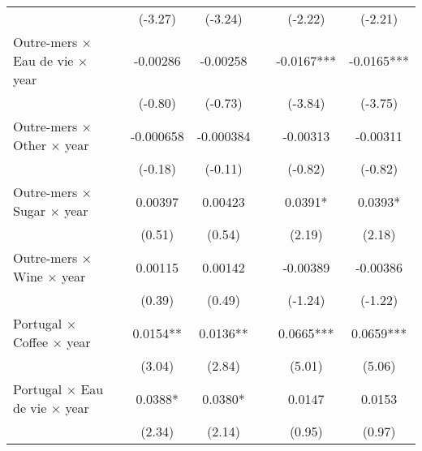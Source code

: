 {\begin{tabular}{l*{6}{c}}
                    &                     &     (-3.27)         &     (-3.24)         &                     &     (-2.22)         &     (-2.21)         \\
[1em]
Outre-mers $\times$ Eau de vie $\times$ year&                     &    -0.00286         &    -0.00258         &                     &     -0.0167***&     -0.0165***\\
                    &                     &     (-0.80)         &     (-0.73)         &                     &     (-3.84)         &     (-3.75)         \\
[1em]
Outre-mers $\times$ Other $\times$ year&                     &   -0.000658         &   -0.000384         &                     &    -0.00313         &    -0.00311         \\
                    &                     &     (-0.18)         &     (-0.11)         &                     &     (-0.82)         &     (-0.82)         \\
[1em]
Outre-mers $\times$ Sugar $\times$ year&                     &     0.00397         &     0.00423         &                     &      0.0391*  &      0.0393*  \\
                    &                     &      (0.51)         &      (0.54)         &                     &      (2.19)         &      (2.18)         \\
[1em]
Outre-mers $\times$ Wine $\times$ year&                     &     0.00115         &     0.00142         &                     &    -0.00389         &    -0.00386         \\
                    &                     &      (0.39)         &      (0.49)         &                     &     (-1.24)         &     (-1.22)         \\
[1em]
Portugal $\times$ Coffee $\times$ year&                     &      0.0154** &      0.0136** &                     &      0.0665***&      0.0659***\\
                    &                     &      (3.04)         &      (2.84)         &                     &      (5.01)         &      (5.06)         \\
[1em]
Portugal $\times$ Eau de vie $\times$ year&                     &      0.0388*  &      0.0380*  &                     &      0.0147         &      0.0153         \\
                    &                     &      (2.34)         &      (2.14)         &                     &      (0.95)         &      (0.97)         \\

\end{tabular}}
